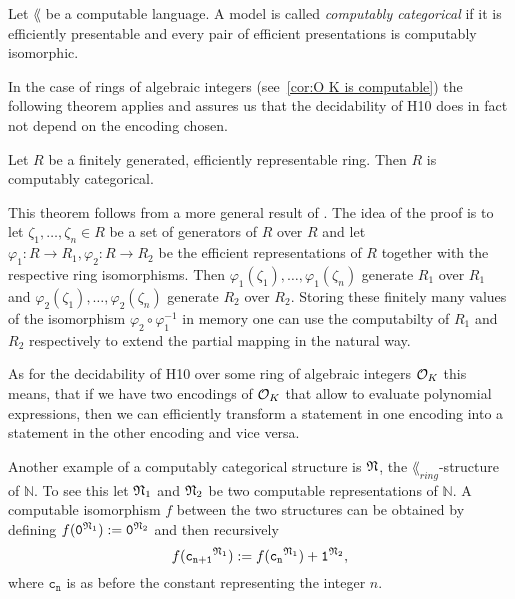 \begin{defin}
  Let \(\lang\) be a computable language. A model is called \emph{computably
  categorical} if it is efficiently presentable and every pair of efficient
  presentations is computably isomorphic.
\end{defin}

In the case of rings of algebraic integers (see~\cref{cor:O K is computable})
the following theorem applies and assures us that the decidability of
\textsc{H10} does in fact not depend on the encoding chosen.

\begin{thm}\label{thm:computable categoricity}
  Let \(R\) be a finitely generated, efficiently representable ring. Then \(R\)
  is computably categorical.
\end{thm}

This theorem follows from a more general result of \textcite{Malcev1961}. The
idea of the proof is to let \(ζ_1, …, ζ_n ∈ R\) be a set of generators of \(R\)
over \(R\) and let \(φ_1: R → R_1, φ_2: R → R_2\) be the efficient
representations of \(R\) together with the respective ring isomorphisms. Then
\(φ_1(ζ_1), …, φ_1(ζ_n)\) generate \(R_1\) over \(R_1\) and \(φ_2(ζ_1), …,
φ_2(ζ_n)\) generate \(R_2\) over \(R_2\). Storing these finitely many values of
the isomorphism \(φ_2 \circ φ_1^{-1}\) in memory one can use the computabilty of
\(R_1\) and \(R_2\) respectively to extend the partial mapping in the natural
way.

As for the decidability of \textsc{H10} over some ring of algebraic integers
\(\mathcal{O}_{K}\) this means, that if we have two encodings of \(\mathcal{O}_{K}\) that allow
to evaluate polynomial expressions, then we can efficiently transform a
statement in one encoding into a statement in the other encoding and vice versa.

\begin{exam}\label{ex:N is computably categorical}
  Another example of a computably categorical structure is \(\mathfrak{N}\), the
  \(\lang_{ring}\)-structure of \(ℕ\). To see this let \(\mathfrak{N}_1\) and
  \(\mathfrak{N}_2\) be two computable representations of \(ℕ\). A computable
  isomorphism \(f\) between the two structures can be obtained by defining
  \(f(\mathtt{0}^{\mathfrak{N}_1}) := \mathtt{0}^{\mathfrak{N}_2}\) and then
  recursively
  \[
    f(\mathtt{c_{n + 1}}^{\mathfrak{N}_1}) := f(\mathtt{c_n}^{\mathfrak{N}_1}) +
    \mathtt{1}^{\mathfrak{N}_2},
  \]
  where \(\mathtt{c_{n}}\) is as before the constant representing the integer
  \(n\).
\end{exam}

